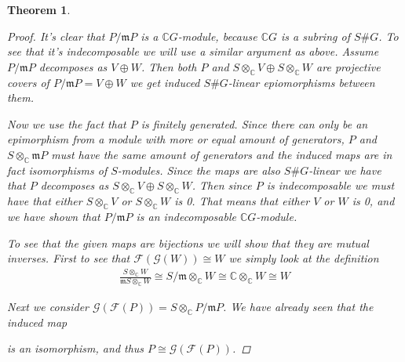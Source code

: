 \documentclass[11pt, a4paper, english]{article}
\numberwithin{prop}{section}
\numberwithin{lemma}{section}
\newtheorem{theorem}{Theorem}
\numberwithin{theorem}{section}
\numberwithin{defin}{section}
\numberwithin{example}{section}
\newcommand{\C}{\mathbb{C}}
\begin{document}
\begin{theorem}
\begin{proof}
It's clear that $P/\mathfrak{m}P$ is a $\C G$-module, because $\C G$ is a subring of $S\#G$. To see that it's indecomposable we will use a similar argument as above. Assume $P/\mathfrak{m}P$ decomposes as $V \oplus W$. Then both $P$ and $S\otimes_\C V \oplus S \otimes_\C W$ are projective covers of $P/\mathfrak{m}P = V\oplus W$ we get induced $S\#G$-linear epiomorphisms between them.

\begin{center}
\end{center}

Now we use the fact that $P$ is finitely generated. Since there can only be an epimorphism from a module with more or equal amount of generators, $P$ and $S\otimes_\C \mathfrak{m}P$ must have the same amount of generators and the induced maps are in fact isomorphisms of $S$-modules. Since the maps are also $S\#G$-linear we have that $P$ decomposes as $S\otimes_\C V \oplus S \otimes_\C W$. Then since $P$ is indecomposable we must have that either $S \otimes_\C V$ or $S\otimes_\C W$ is 0. That means that either $V$ or $W$ is 0, and we have shown that $P/\mathfrak{m}P$ is an indecomposable $\C G$-module.

To see that the given maps are bijections we will show that they are mutual inverses. First to see that $\mathcal{F}(\mathcal{G}(W)) \cong W$ we simply look at the definition
\begin{equation*}
\begin{split}
\frac{S \otimes_\C W}{\mathfrak{m}S \otimes_\C W} \cong S/\mathfrak{m} \otimes_\C W \cong \C \otimes_\C W \cong W
\end{split}
\end{equation*}

Next we consider $\mathcal{G}(\mathcal{F}(P)) = S \otimes_\C P/\mathfrak{m}P$. We have already seen that the induced map
\begin{center}
\end{center}
is an isomorphism, and thus $P \cong \mathcal{G}(\mathcal{F}(P))$.
\end{proof}

\end{theorem}
\end{document}
